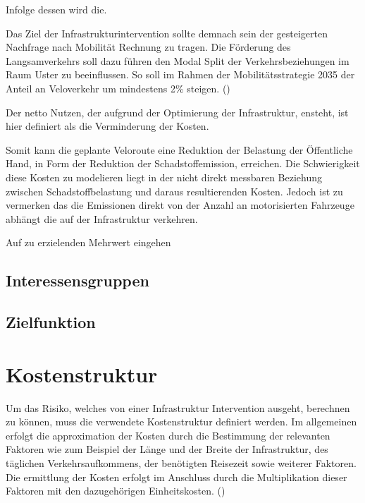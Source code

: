  
Infolge dessen wird die.



Das Ziel der Infrastrukturintervention sollte demnach sein der gesteigerten Nachfrage nach Mobilität Rechnung zu tragen. Die Förderung des Langsamverkehrs soll dazu führen den Modal Split der Verkehrsbeziehungen im Raum Uster zu beeinflussen. So soll im Rahmen der Mobilitätsstrategie 2035 der Anteil an Veloverkehr um mindestens 2\% steigen. (\cite{STEK})

Der netto Nutzen, der aufgrund der Optimierung der Infrastruktur, ensteht, ist hier definiert als die Verminderung der Kosten.

Somit kann die geplante Veloroute eine Reduktion der Belastung der Öffentliche Hand, in Form der Reduktion der Schadstoffemission, erreichen. 	
Die Schwierigkeit diese Kosten zu modelieren liegt in der nicht direkt messbaren Beziehung zwischen Schadstoffbelastung und daraus resultierenden Kosten. Jedoch ist zu vermerken das die Emissionen direkt von der Anzahl an motorisierten Fahrzeuge abhängt die auf der Infrastruktur verkehren.

Auf zu erzielenden Mehrwert eingehen

	\subsection{Interessensgruppen}
	

	\subsection{Zielfunktion}
	
	

\section{Kostenstruktur}
\label{sec:Kosten}

Um das Risiko, welches von einer Infrastruktur Intervention ausgeht, berechnen zu können, muss die verwendete Kostenstruktur definiert werden. 
Im allgemeinen erfolgt die approximation der Kosten durch die Bestimmung der relevanten Faktoren wie zum Beispiel der Länge und der Breite der Infrastruktur, des täglichen Verkehrsaufkommens, der benötigten Reisezeit sowie weiterer Faktoren. Die ermittlung der Kosten erfolgt im Anschluss durch die Multiplikation dieser Faktoren mit den dazugehörigen Einheitskosten. (\cite{Adey2012}) 

